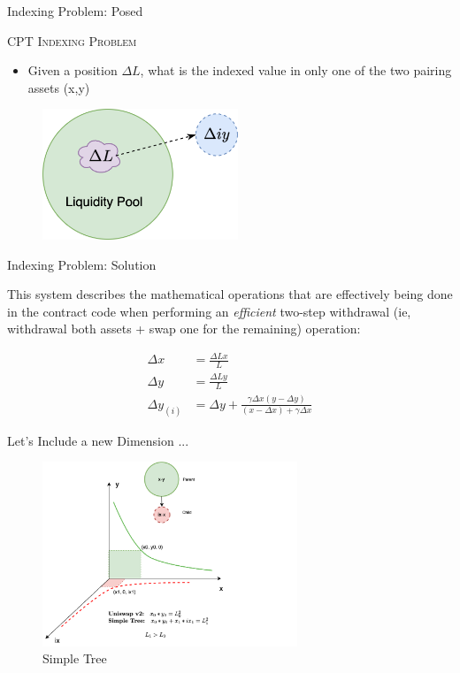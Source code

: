 \documentclass[10pt,xcolor=svgnames]{beamer} %
\begin{document}
\begin{frame}{Indexing Problem: Posed} 

\begin{exampleblock}{\textsc{CPT Indexing Problem}}
\begin{itemize}
  \item Given a position $\Delta L$, what is the indexed value in only one of the two pairing assets (x,y)
\end{itemize}
\end{exampleblock}

\begin{figure}[h!]
\includegraphics[width=2.3in]{img/indexed_tkn_lrg.png}
\label{fig:uniswap_v3}
\end{figure}



\end{frame}


\begin{frame}{Indexing Problem: Solution} 

This system describes the mathematical operations that are effectively being done in the contract code when performing an \textit{efficient} two-step withdrawal (ie, withdrawal both assets + swap one for the remaining) operation: 

\begin{align}
\Delta x &=\frac{\Delta L x}{L}\\
\Delta y &=\frac{\Delta L y}{L}\\
\Delta y_{(i)} &= \Delta y + \frac{\gamma \Delta x (y - \Delta y)}{(x - \Delta x) + \gamma \Delta x}
\end{align}

\end{frame}


\begin{frame}{Let's Include a new Dimension ...} 
 
\begin{figure}[h!]
\includegraphics[width=3in]{img/simple_tree.png}
\caption{Simple Tree} 
\label{fig:simple_tree}
\end{figure}

\end{frame}
\end{document}
